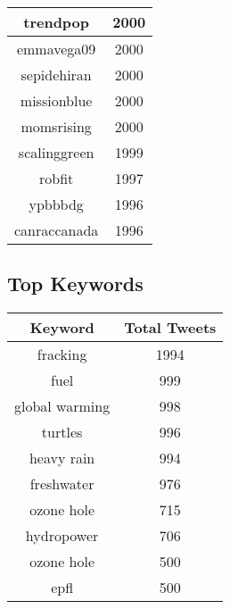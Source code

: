 \documentclass{article}\usepackage[T1]{fontenc}
\begin{document}
\begin{tabular}{|c|c|}
trendpop & 2000\\ 
 \hline
emmavega09 & 2000\\ 
 \hline
sepidehiran & 2000\\ 
 \hline
missionblue & 2000\\ 
 \hline
momsrising & 2000\\ 
 \hline
scalinggreen & 1999\\ 
 \hline
robfit & 1997\\ 
 \hline
ypbbbdg & 1996\\ 
 \hline
canraccanada & 1996\\ 
 \hline
\end{tabular}\subsection*{Top Keywords}\begin{tabular}{|c|c|}         \hline         Keyword & Total Tweets \\ 
 \hline
fracking & 1994\\ 
 \hline
fuel & 999\\ 
 \hline
global warming & 998\\ 
 \hline
turtles & 996\\ 
 \hline
heavy rain & 994\\ 
 \hline
freshwater & 976\\ 
 \hline
ozone hole & 715\\ 
 \hline
hydropower & 706\\ 
 \hline
ozone hole & 500\\ 
 \hline
epfl & 500\\ 
 \hline
\end{tabular}
\end{document}
